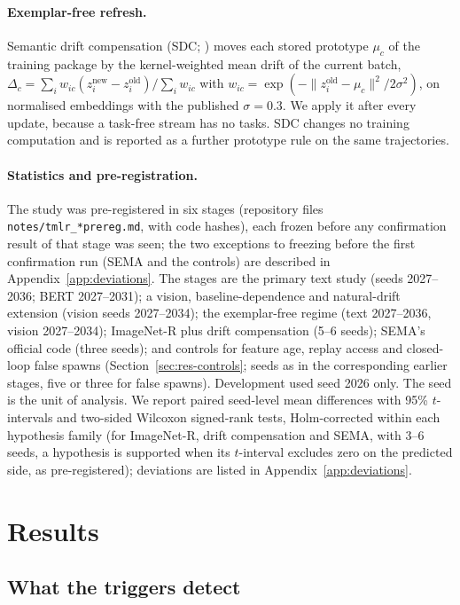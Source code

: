 \documentclass[10pt]{article}
\begin{document}
\paragraph{Exemplar-free refresh.} Semantic drift compensation (SDC; \citealp{yu2020sdc}) moves each stored prototype $\mu_c$ of the training package by the kernel-weighted mean drift of the current batch, $\Delta_c=\sum_i w_{ic}(z_i^{\text{new}}-z_i^{\text{old}})/\sum_i w_{ic}$ with $w_{ic}=\exp(-\|z_i^{\text{old}}-\mu_c\|^2/2\sigma^2)$, on normalised embeddings with the published $\sigma=0.3$. We apply it after every update, because a task-free stream has no tasks. SDC changes no training computation and is reported as a further prototype rule on the same trajectories.

\paragraph{Statistics and pre-registration.} The study was pre-registered in six stages (repository files \texttt{notes/tmlr\_*prereg.md}, with code hashes), each frozen before any confirmation result of that stage was seen; the two exceptions to freezing before the first confirmation run (SEMA and the controls) are described in Appendix~\ref{app:deviations}. The stages are the primary text study (seeds 2027--2036; BERT 2027--2031); a vision, baseline-dependence and natural-drift extension (vision seeds 2027--2034); the exemplar-free regime (text 2027--2036, vision 2027--2034); ImageNet-R plus drift compensation (5--6 seeds); SEMA's official code (three seeds); and controls for feature age, replay access and closed-loop false spawns (Section~\ref{sec:res-controls}; seeds as in the corresponding earlier stages, five or three for false spawns). Development used seed 2026 only. The seed is the unit of analysis. We report paired seed-level mean differences with 95\% $t$-intervals and two-sided Wilcoxon signed-rank tests, Holm-corrected within each hypothesis family (for ImageNet-R, drift compensation and SEMA, with 3--6 seeds, a hypothesis is supported when its $t$-interval excludes zero on the predicted side, as pre-registered); deviations are listed in Appendix~\ref{app:deviations}.

\section{Results}
\label{sec:results}



\subsection{What the triggers detect}
\label{sec:res-detect}
\end{document}
